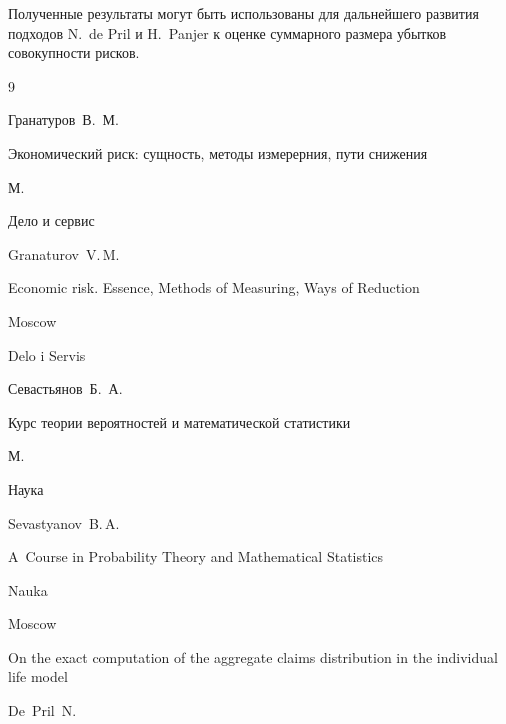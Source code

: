 Полученные результаты могут быть использованы для дальнейшего развития подходов N.~de Pril и H.~Panjer к оценке суммарного размера убытков совокупности рисков.



\begin{thebibliography}{9}




\by Гранатуров~В.~М.

\book  Экономический риск: сущность, методы измерерния, пути снижения

\publaddr М.

\publ Дело и сервис



\misctransl

\by Granaturov~V.\,M.

\book Economic risk. Essence, Methods of Measuring, Ways of Reduction

\publaddr Moscow

\publ Delo i Servis






\by Севастьянов~Б.~А.

\book  Курс теории вероятностей и математической статистики

\publaddr М.

\publ Наука



\misctransl

\by Sevastyanov~B.\,A.

\book A~Course in Probability Theory and Mathematical Statistics

\publ Nauka

\publaddr Moscow 








\paper On the exact computation of the aggregate claims distribution in the individual life model

\by De~Pril~N.


\end{thebibliography}
